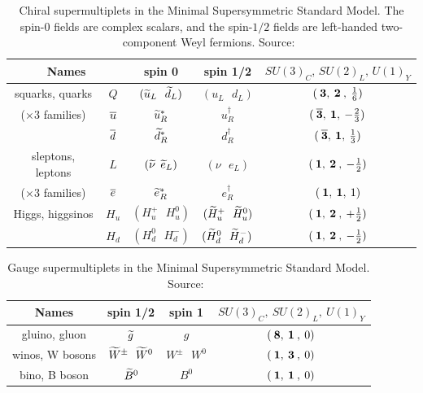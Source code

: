 \begin{table}[tb]
  \begin{center}
    \begin{tabular}{|c|c|c|c|c|}
      \hline
      \multicolumn{2}{|c|}{Names} 
      & spin 0 & spin 1/2 & $SU(3)_C ,\, SU(2)_L ,\, U(1)_Y$
      \\  \hline\hline
      squarks, quarks & $Q$ & $({\widetilde u}_L\>\>\>{\widetilde d}_L )$&
      $(u_L\>\>\>d_L)$ & $(\>{\bf 3},\>{\bf 2}\>,\>{1\over 6})$
      \\
      ($\times 3$ families) & $\overline u$
      &${\widetilde u}^*_R$ & $u^\dagger_R$ & 
      $(\>{\bf \overline 3},\> {\bf 1},\> -{2\over 3})$
      \\ & $\overline d$ &${\widetilde d}^*_R$ & $d^\dagger_R$ & 
      $(\>{\bf \overline 3},\> {\bf 1},\> {1\over 3})$
      \\  \hline
      sleptons, leptons & $L$ &$({\widetilde \nu}\>\>{\widetilde e}_L )$&
      $(\nu\>\>\>e_L)$ & $(\>{\bf 1},\>{\bf 2}\>,\>-{1\over 2})$
      \\
      ($\times 3$ families) & $\overline e$
      &${\widetilde e}^*_R$ & $e^\dagger_R$ & $(\>{\bf 1},\> {\bf 1},\>1)$
      \\  \hline
      Higgs, higgsinos &$H_u$ &$(H_u^+\>\>\>H_u^0 )$&
      $(\widetilde H_u^+ \>\>\> \widetilde H_u^0)$& 
      $(\>{\bf 1},\>{\bf 2}\>,\>+{1\over 2})$
      \\ &$H_d$ & $(H_d^0 \>\>\> H_d^-)$ & $(\widetilde H_d^0 \>\>\> \widetilde H_d^-)$& 
      $(\>{\bf 1},\>{\bf 2}\>,\>-{1\over 2})$
      \\  \hline
    \end{tabular}
    \caption[Chiral supermultiplets in the MSSM]{Chiral supermultiplets in the
    Minimal Supersymmetric Standard Model.  The spin-$0$ fields are complex
    scalars, and the spin-$1/2$ fields are left-handed two-component Weyl
    fermions. Source:~\cite{Martin:1997um}\label{tab:chiral}} \vspace{-0.6cm}
  \end{center}
\end{table}
%
\renewcommand{\arraystretch}{1.55}
\begin{table}[t]
  \begin{center}
    \begin{tabular}{|c|c|c|c|}
      \hline
      Names & spin 1/2 & spin 1 & $SU(3)_C, \> SU(2)_L,\> U(1)_Y$\\
      \hline\hline
      gluino, gluon &$ \widetilde g$& $g$ & $(\>{\bf 8},\>{\bf 1}\>,\> 0)$
      \\
      \hline
      winos, W bosons & $ \widetilde W^\pm\>\>\> \widetilde W^0 $&
      $W^\pm\>\>\> W^0$ & $(\>{\bf 1},\>{\bf 3}\>,\> 0)$
      \\
      \hline
      bino, B boson &$\widetilde B^0$&
      $B^0$ & $(\>{\bf 1},\>{\bf 1}\>,\> 0)$
      \\
      \hline
    \end{tabular}
    \caption[Gauge supermultiplets in the MSSM]{Gauge supermultiplets in the
    Minimal Supersymmetric Standard Model. Source:~\cite{Martin:1997um}
    \label{tab:gauge}} \vspace{-0.45cm}
  \end{center}
\end{table}

